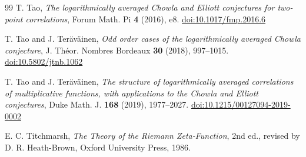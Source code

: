 \documentclass[11pt]{amsart}
\numberwithin{equation}{section}
\theoremstyle{plain}
\theoremstyle{definition}
\theoremstyle{remark}
\begin{document}
\begin{thebibliography}{99}
 T. Tao, \emph{The logarithmically averaged Chowla and Elliott conjectures for two-point correlations}, Forum Math. Pi \textbf{4} (2016), e8. \href{https://doi.org/10.1017/fmp.2016.6}{doi:10.1017/fmp.2016.6}

 T. Tao and J. Teräväinen, \emph{Odd order cases of the logarithmically averaged Chowla conjecture}, J. Théor. Nombres Bordeaux \textbf{30} (2018), 997--1015. \href{https://doi.org/10.5802/jtnb.1062}{doi:10.5802/jtnb.1062}

 T. Tao and J. Teräväinen, \emph{The structure of logarithmically averaged correlations of multiplicative functions, with applications to the Chowla and Elliott conjectures}, Duke Math. J. \textbf{168} (2019), 1977--2027. \href{https://doi.org/10.1215/00127094-2019-0002}{doi:10.1215/00127094-2019-0002}

 E. C. Titchmarsh, \emph{The Theory of the Riemann Zeta-Function}, 2nd ed., revised by D. R. Heath-Brown, Oxford University Press, 1986.

\end{thebibliography}
\end{document}
